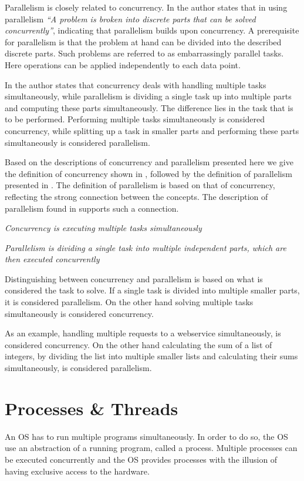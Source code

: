 Parallelism is closely related to concurrency. In \cite{introPar} the author states that in using parallelism \textit{``A problem is broken into discrete parts that can be solved concurrently''}, indicating that parallelism builds upon concurrency. A prerequisite for parallelism is that the problem at hand can be divided into the described discrete parts. Such problems are referred to as embarrassingly parallel tasks\cite{sutter2005software}. Here operations can be applied independently to each data point.

In \cite[p. 24]{sevenModels} the author states that concurrency deals with handling multiple tasks simultaneously, while parallelism is dividing a single task up into multiple parts and computing these parts simultaneously. The difference lies in the task that is to be performed. Performing multiple tasks simultaneously is considered concurrency, while splitting up a task in smaller parts and performing these parts simultaneously is considered parallelism.

Based on the descriptions of concurrency and parallelism presented here we give the definition of concurrency shown in , followed by the definition of parallelism presented in . The definition of parallelism is based on that of concurrency, reflecting the strong connection between the concepts. The description of parallelism found in \cite{introPar} supports such a connection.
\begin{defn}\label{def:concurrency}
\emph{Concurrency is executing multiple tasks simultaneously}
\end{defn}

\begin{defn}\label{def:parallelism}
\emph{Parallelism is dividing a single task into multiple independent parts, which are then executed concurrently}
\end{defn}
Distinguishing between concurrency and parallelism is based on what is considered the task to solve. If a single task is divided into multiple smaller parts, it is considered parallelism. On the other hand solving multiple tasks simultaneously is considered concurrency.

As an example, handling multiple requests to a webservice simultaneously, is considered concurrency. On the other hand calculating the sum of a list of integers, by dividing the list into multiple smaller lists and calculating their sums simultaneously, is considered parallelism.

\section{Processes \& Threads}\label{sec:processes_threads}
An \ac{OS} has to run multiple programs simultaneously. In order to do so, the \ac{OS} use an abstraction of a running program, called a process\cite[p. 81]{tanenbaum2008modern}\cite[p. 16]{bryant2011computer}. Multiple processes can be executed concurrently and the \ac{OS} provides processes with the illusion of having exclusive access to the hardware\cite[p. 16]{bryant2011computer}. 

